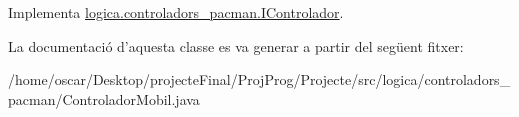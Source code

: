 Implementa \hyperlink{interfacelogica_1_1controladors__pacman_1_1_i_controlador_ac765182730a4337c576a9764cdd521fa}{logica.\+controladors\+\_\+pacman.\+I\+Controlador}.



La documentació d'aquesta classe es va generar a partir del següent fitxer\+:\begin{DoxyCompactItemize}
\item 
/home/oscar/\+Desktop/projecte\+Final/\+Proj\+Prog/\+Projecte/src/logica/controladors\+\_\+pacman/Controlador\+Mobil.\+java\end{DoxyCompactItemize}
